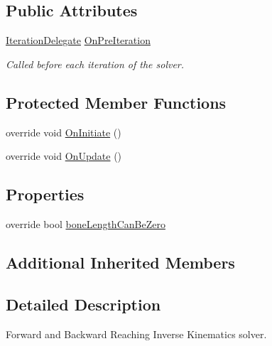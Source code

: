 \subsection*{Public Attributes}
\begin{DoxyCompactItemize}
\item 
\mbox{\hyperlink{class_root_motion_1_1_final_i_k_1_1_i_k_solver_ae3da6a8ccd8224ce56d15c4da5cd1ef7}{Iteration\+Delegate}} \mbox{\hyperlink{class_root_motion_1_1_final_i_k_1_1_i_k_solver_f_a_b_r_i_k_ac7966fdbc869683bd3fd9b68871e2eb3}{On\+Pre\+Iteration}}
\begin{DoxyCompactList}\small\item\em Called before each iteration of the solver. \end{DoxyCompactList}\end{DoxyCompactItemize}
\subsection*{Protected Member Functions}
\begin{DoxyCompactItemize}
\item 
override void \mbox{\hyperlink{class_root_motion_1_1_final_i_k_1_1_i_k_solver_f_a_b_r_i_k_a1d4c5d7ee7db732fca38ca620fecd072}{On\+Initiate}} ()
\item 
override void \mbox{\hyperlink{class_root_motion_1_1_final_i_k_1_1_i_k_solver_f_a_b_r_i_k_a566881ceecf156d9a08a21dbfb64b3b1}{On\+Update}} ()
\end{DoxyCompactItemize}
\subsection*{Properties}
\begin{DoxyCompactItemize}
\item 
override bool \mbox{\hyperlink{class_root_motion_1_1_final_i_k_1_1_i_k_solver_f_a_b_r_i_k_a93177275f835e30c05ca8873d91e727d}{bone\+Length\+Can\+Be\+Zero}}
\end{DoxyCompactItemize}
\subsection*{Additional Inherited Members}


\subsection{Detailed Description}
Forward and Backward Reaching Inverse Kinematics solver. 

